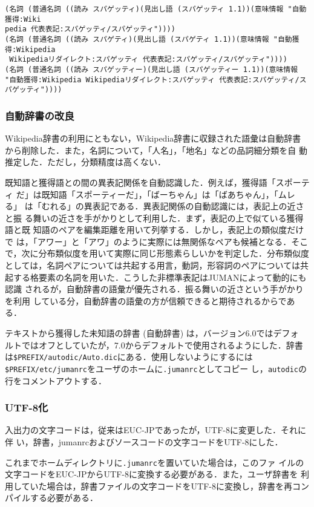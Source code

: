 \documentclass[a4j,titlepage]{jarticle}
\begin{document}
\begin{verbatim}
(名詞 (普通名詞 ((読み スパゲッティ)(見出し語 (スパゲッティ 1.1))(意味情報 "自動獲得:Wiki
pedia 代表表記:スパゲッティ/スパゲッティ"))))
(名詞 (普通名詞 ((読み スパゲティ)(見出し語 (スパゲティ 1.1))(意味情報 "自動獲得:Wikipedia
 Wikipediaリダイレクト:スパゲッティ 代表表記:スパゲッティ/スパゲッティ"))))
(名詞 (普通名詞 ((読み スパゲッティー)(見出し語 (スパゲッティー 1.1))(意味情報 "自動獲得:Wikipedia Wikipediaリダイレクト:スパゲッティ 代表表記:スパゲッティ/スパゲッティ"))))
\end{verbatim}


\subsubsection{自動辞書の改良}

Wikipedia辞書の利用にともない，Wikipedia辞書に収録された語彙は自動辞書
から削除した．また，名詞について，「人名」，「地名」などの品詞細分類を自
動推定した．ただし，分類精度は高くない．

既知語と獲得語との間の異表記関係を自動認識した．例えば，獲得語「スポーティ
だ」は既知語「スポーティーだ」，「ばーちゃん」は「ばあちゃん」，「ムレる」
は「むれる」の異表記である．異表記関係の自動認識には，表記上の近さと振
る舞いの近さを手がかりとして利用した．まず，表記の上で似ている獲得語と既
知語のペアを編集距離を用いて列挙する．しかし，表記上の類似度だけで
は，「アワー」と「アワ」のように実際には無関係なペアも候補となる．そこ
で，次に分布類似度を用いて実際に同じ形態素らしいかを判定した．分布類似度
としては，名詞ペアについては共起する用言，動詞，形容詞のペアについては共
起する格要素の名詞を用いた．こうした非標準表記はJUMANによって動的にも認識
されるが，自動辞書の語彙が優先される．振る舞いの近さという手がかりを利用
している分，自動辞書の語彙の方が信頼できると期待されるからである．

テキストから獲得した未知語の辞書 (自動辞書) は，バージョン6.0ではデフォ
ルトではオフとしていたが，7.0からデフォルトで使用されるようにした．辞書
は\texttt{\$PREFIX/autodic/Auto.dic}にある．使用しないようにするには
\texttt{\$PREFIX/etc/jumanrc}をユーザのホームに{\tt .jumanrc}としてコピー
し，\texttt{autodic}の行をコメントアウトする．


\subsubsection{UTF-8化}

入出力の文字コードは，従来はEUC-JPであったが，UTF-8に変更した．それに伴
い，辞書，jumanrcおよびソースコードの文字コードをUTF-8にした．

これまでホームディレクトリに\texttt{.jumanrc}を置いていた場合は，このファ
イルの文字コードをEUC-JPからUTF-8に変換する必要がある．また，ユーザ辞書を
利用していた場合は，辞書ファイルの文字コードをUTF-8に変換し，辞書を再コン
パイルする必要がある．


\end{document}
